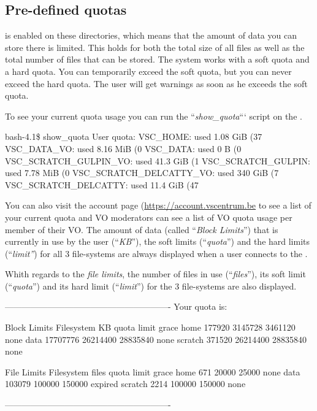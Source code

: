 \subsection{Pre-defined quotas}
\label{subsec:predfined-quotas}
\hypertarget{predefined-quotas}{}

 is enabled on these directories, which means that the amount of
data you can store there is limited. This holds for both the total size of all
files as well as the total number of files that can be stored. The system works
with a soft quota and a hard quota. You can temporarily exceed the soft quota,
but you can never exceed the hard quota. The user will get warnings as soon as
he exceeds the soft quota.


\ifgent
To see your current quota usage you can run the ``\emph{show\_quota}``` script
on the \hpcInfra.

\begin{prompt}
bash-4.1\$ show_quota
User quota:
VSC_HOME: used 1.08 GiB (37%
VSC_DATA_VO: used 8.16 MiB (0%
VSC_DATA: used 0 B (0%
VSC_SCRATCH_GULPIN_VO: used 41.3 GiB (1%
VSC_SCRATCH_GULPIN: used 7.78 MiB (0%
VSC_SCRATCH_DELCATTY_VO: used 340 GiB (7%
VSC_SCRATCH_DELCATTY: used 11.4 GiB (47%
\end{prompt}

You can also visit the account page (\url{https://account.vscentrum.be}
to see a list of your current quota and
VO moderators can see a list of VO quota usage per member of their VO.
\else
The amount of data (called ``\emph{Block Limits}'') that is currently in use
by the user (``\emph{KB}''), the soft limits (``\emph{quota}'') and the
hard limits (``\emph{limit''}) for all 3 file-systems are always displayed
when a user connects to the \hpc.

 Whith regards to the \emph{file limits}, the number of files in use
 (``\emph{files}''), its soft limit (``\emph{quota}'') and its hard limit
 (``\emph{limit}'') for the 3 file-systems are also displayed.

\begin{prompt}
----------------------------------------------------------
Your quota is:

                   Block Limits
   Filesystem         KB      quota      limit    grace
   home           177920    3145728    3461120     none
   data         17707776   26214400   28835840     none
   scratch        371520   26214400   28835840     none

                File Limits
   Filesystem      files      quota      limit    grace
   home              671      20000      25000     none
   data           103079     100000     150000  expired
   scratch          2214     100000     150000     none

----------------------------------------------------------
\end{prompt}

